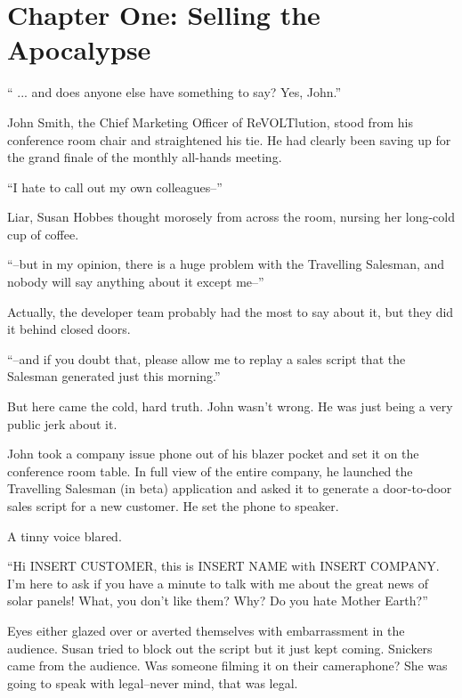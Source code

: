 \chapter{Chapter One: Selling the Apocalypse}

\newcommand{\protag}{Susan}
\newcommand{\sidetag}{Calvin}
\newcommand{\crunchyCity}{Bayder}
\newcommand{\energyJerk}{Canyon}
\newcommand{\energyCompany}{ReVOLTlution}

`` ... and does anyone else have something to say? Yes, John.''

John Smith, the Chief Marketing Officer of ReVOLTlution, stood from his conference room chair and straightened his tie. He had clearly been saving up for the grand finale of the monthly all-hands meeting.

``I hate to call out my own colleagues--''

Liar, {\protag} Hobbes thought morosely from across the room, nursing her long-cold cup of coffee.

``--but in my opinion, there is a huge problem with the Travelling Salesman, and nobody will say anything about it except me--''

Actually, the developer team probably had the most to say about it, but they did it behind closed doors.

``--and if you doubt that, please allow me to replay a sales script that the Salesman generated just this morning.''

But here came the cold, hard truth. John wasn't wrong. He was just being a very public jerk about it.

John took a company issue phone out of his blazer pocket and set it on the conference room table. In full view of the entire company, he launched the Travelling Salesman (in beta) application and asked it to generate a door-to-door sales script for a new customer. He set the phone to speaker.

A tinny voice blared.

``Hi INSERT CUSTOMER, this is INSERT NAME with INSERT COMPANY. I'm here to ask if you have a minute to talk with me about the great news of solar panels! What, you don't like them? Why? Do you hate Mother Earth?''

Eyes either glazed over or averted themselves with embarrassment in the audience. {\protag} tried to block out the script but it just kept coming. Snickers came from the audience. Was someone filming it on their cameraphone? She was going to speak with legal--never mind, that was legal.

